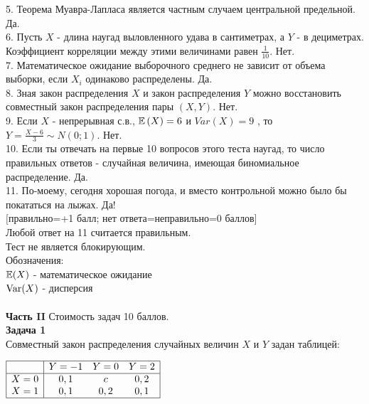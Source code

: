 \documentclass[12pt, a4paper]{article}\usepackage[]{graphicx}\usepackage[]{color}
\begin{document}
	5. Теорема Муавра-Лапласа является частным случаем центральной
	предельной. Да. \\

	6. Пусть $X$ - длина наугад выловленного удава в сантиметрах, а
	$Y$ - в дециметрах. Коэффициент корреляции между этими
	величинами равен $\frac{1}{10}$. Нет. \\

	7. Математическое ожидание выборочного среднего не зависит от
	объема выборки, если $X_{i}$ одинаково распределены. Да.  \\

	8. Зная закон распределения $X$ и закон распределения $Y$
	можно восстановить совместный закон распределения пары $(X,Y)$. Нет. \\

	9. Если  $X$  - непрерывная с.в.,  $\mathbb{E}\left(X\right)=6$  и
	$Var\left(X\right)=9$ , то  $Y=\frac{X-6}{3} \sim
	N\left(0;1\right)$.  Нет. \\

	10. Если ты отвечать на первые 10 вопросов этого теста наугад, то
	число правильных ответов - случайная величина, имеющая
	биномиальное распределение. Да.  \\

	11. По-моему, сегодня хорошая погода, и вместо контрольной можно
	было бы покататься на лыжах. Да! \\


	$[$правильно=+1 балл; нет ответа=неправильно=0 баллов$]$ \\
	Любой ответ на 11 считается правильным. \\
	Тест не является блокирующим. \\
	Обозначения: \\
	$\mathbb{E}(X)$ - математическое ожидание \\
	$\operatorname{Var}(X)$ - дисперсия \\ \\


	\textbf{Часть II} Стоимость задач 10 баллов. \\


	\textbf{Задача 1} \\ %
	Совместный закон распределения случайных величин  $X$  и  $Y$
	задан таблицей:

	$\begin{array}{|c|ccc|} \hline {} & {Y=-1} & {Y=0} & {Y=2}
	\\  \hline {X=0} & {0,1} & {c} & {0,2}
	\\ {X=1} & {0,1} & {0,2} & {0,1} \\  \hline  \end{array}$
\end{document}
